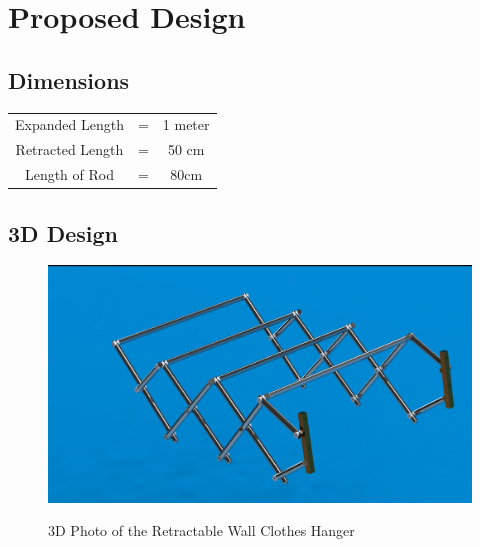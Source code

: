 \documentclass[12pt,a4paper]{article}
\begin{document}
\section{Proposed Design}


\subsection{Dimensions}

\begin{tabular}{ccc}
Expanded Length    &  =  & 1 meter \\
Retracted Length  & = & 50 cm \\
Length of Rod & = & 80cm \\
\end{tabular}

\subsection{3D Design}
\begin{figure}[hbt!]
\caption{3D Photo of the Retractable Wall Clothes Hanger}
\includegraphics[width=5in,keepaspectratio]{3dphoto.jpg}\\[0.5cm]
\end{figure}


\printbibliography[heading=bibintoc,title={References}]
% 
\end{document}
